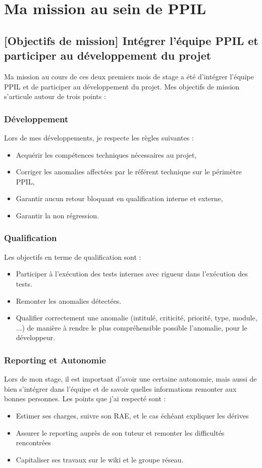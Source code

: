 \chapter{Ma mission au sein de PPIL}
\label{sec:unchapitre}

\section{[Objectifs de mission] Intégrer l'équipe PPIL et participer au développement du projet}
Ma mission au cours de ces deux premiers mois de stage a été d'intégrer l'équipe PPIL et de participer au développement du projet. Mes objectifs de mission s'articule autour de trois points :
\subsection{Développement} 
Lors de mes développements, je respecte les règles suivantes :
\begin{itemize}
    \item Acquérir les compétences techniques nécessaires au projet,
    \item Corriger les anomalies affectées par le référent technique sur le périmètre PPIL, 
    \item Garantir aucun retour bloquant en qualification interne et externe,
    \item Garantir la non régression.
\end{itemize}
\subsection{Qualification} 
Les objectifs en terme de qualification sont :
\begin{itemize}
    \item Participer à l'exécution des tests internes avec rigueur dans l'exécution des tests.
    \item Remonter les anomalies détectées. 
    \item Qualifier correctement une anomalie (intitulé, criticité, priorité, type, module, ...) de manière à rendre le plus compréhensible possible l'anomalie, pour le développeur.
\end{itemize}
\subsection{Reporting et Autonomie} 
Lors de mon stage, il est important d'avoir une certaine autonomie, mais aussi de bien s'intégrer dans l'équipe et de savoir quelles informations remonter aux bonnes personnes. Les points que j'ai respecté sont :
\begin{itemize}
    \item Estimer ses charges, suivre son RAE, et le cas échéant expliquer les dérives 
    \item Assurer le reporting auprès de son tuteur et remonter les difficultés rencontrées
    \item Capitaliser ses travaux sur le wiki et le groupe réseau.
\end{itemize}
